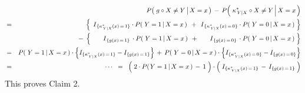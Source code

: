 \begin{eqnarray*}
&&
	P\!\left(\,\left. g \overset{{\color{white}.}}{\circ} X \neq Y \,\right\vert X = x \,\right)
	\, - \,
	P\!\left(\,\left. \kappa^{*}_{\,Y \vert X} \overset{{\color{white}.}}{\circ} X \neq Y \,\right\vert X = x \,\right)
\\
&=&
	{\color{white}- \;}
	\left\{\;
		\,\overset{{\color{white}.}}{I}_{\{\kappa^{*}_{\,Y \vert X}(x)\,=\,1\}} \cdot P\!\left(\,\left. Y = 1 \,\right\vert X = x \,\right)\,
		\; + \;
		\,\overset{{\color{white}.}}{I}_{\{\kappa^{*}_{\,Y \vert X}(x)\,=\,0\}} \cdot P\!\left(\,\left. Y = 0 \,\right\vert X = x \,\right)
		\;\right\}
\\
&&
	- \;
	\left\{\;
		\,{\color{white}111}\overset{{\color{white}.}}{I}_{\{g(x)\,=\,1\}}\, \cdot P\!\left(\,\left. Y = 1 \,\right\vert X = x \,\right)\,
		\; + \;
		\,\,\,{\color{white}11}\overset{{\color{white}.}}{I}_{\{g(x)\,=\,0\}}\, \cdot P\!\left(\,\left. Y = 0 \,\right\vert X = x \,\right)
		\;\right\}
\\
&=&
	P\!\left(\,\left. Y = 1 \,\right\vert X = x \,\right) \cdot \left\{ I_{\{\kappa^{*}_{\,Y \vert X}(x)\,=\,1\}} \overset{{\color{white}.}}{-} I_{\{g(x)\,=\,1\}} \right\}
	\,+\,
	P\!\left(\,\left. Y = 0 \,\right\vert X = x \,\right) \cdot \left\{ I_{\{\kappa^{*}_{\,Y \vert X}(x)\,=\,0\}} \overset{{\color{white}.}}{-} I_{\{g(x)\,=\,0\}} \right\}
\\
&=&
	\cdots
	\;\; = \;\;
	\left(\; 2 \cdot P\!\left(\left.Y=1\,\right\vert X =x \,\right) \,\overset{{\color{white}.}}{-}\, 1 \;\right)
	\cdot
	\left(\; I_{\{\kappa^{*}_{\,Y \vert X}(x)\,=\,1\}} \,\overset{{\color{white}.}}{-}\, I_{\{g(x)\,=\,1\}} \;\right)
\end{eqnarray*}
This proves Claim 2.

